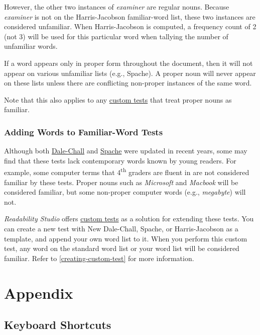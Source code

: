 \documentclass[
]{book}
\theoremstyle{definition}
\theoremstyle{definition}
\theoremstyle{definition}
\theoremstyle{definition}
\theoremstyle{remark}
\begin{document}
However, the other two instances of \emph{examiner} are regular nouns. Because \emph{examiner} is not on the Harris-Jacobson familiar-word list, these two instances are considered unfamiliar. When Harris-Jacobson is computed, a frequency count of 2 (not 3) will be used for this particular word when tallying the number of unfamiliar words.

If a word appears only in proper form throughout the document, then it will not appear on various unfamiliar lists (e.g., Spache). A proper noun will never appear on these lists unless there are conflicting non-proper instances of the same word.

Note that this also applies to any \protect\hyperlink{creating-custom-test}{custom tests} that treat proper nouns as familiar.

\hypertarget{adding-words-to-familiar-word-tests}{%
\section{Adding Words to Familiar-Word Tests}\label{adding-words-to-familiar-word-tests}}

Although both \protect\hyperlink{dale-chall-test}{Dale-Chall} and \protect\hyperlink{spache-test}{Spache} were updated in recent years, some may find that these tests lack contemporary words known by young readers. For example, some computer terms that 4\textsuperscript{th} graders are fluent in are not considered familiar by these tests. Proper nouns such as \emph{Microsoft} and \emph{Macbook} will be considered familiar, but some non-proper computer words (e.g., \emph{megabyte}) will not.

\emph{Readability Studio} offers \protect\hyperlink{creating-custom-test}{custom tests} as a solution for extending these tests. You can create a new test with New Dale-Chall, Spache, or Harris-Jacobson as a template, and append your own word list to it. When you perform this custom test, any word on the standard word list or your word list will be considered familiar. Refer to \ref{creating-custom-test} for more information.

\hypertarget{part-appendix}{%
\part{Appendix}\label{part-appendix}}

\hypertarget{keyboard-shortcuts}{%
\chapter{Keyboard Shortcuts}\label{keyboard-shortcuts}}
\end{document}
